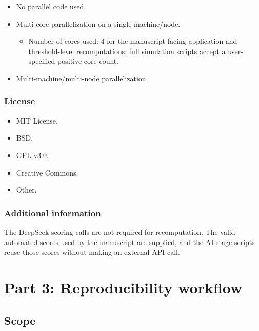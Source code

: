 \documentclass[
  10pt,
]{article}
\providecommand{\tightlist}{%
  \setlength{\itemsep}{0pt}\setlength{\parskip}{0pt}}
\begin{document}
\begin{itemize}
\tightlist
\item[$\square$]
  No parallel code used.
\item[$\boxtimes$]
  Multi-core parallelization on a single machine/node.

  \begin{itemize}
  \tightlist
  \item
    Number of cores used: 4 for the manuscript-facing application and
    threshold-level recomputations; full simulation scripts accept a
    user-specified positive core count.
  \end{itemize}
\item[$\square$]
  Multi-machine/multi-node parallelization.
\end{itemize}

\subsubsection{License}\label{license}

\begin{itemize}
\tightlist
\item[$\boxtimes$]
  MIT License.
\item[$\square$]
  BSD.
\item[$\square$]
  GPL v3.0.
\item[$\square$]
  Creative Commons.
\item[$\square$]
  Other.
\end{itemize}

\subsubsection{Additional information}\label{additional-information-1}

The DeepSeek scoring calls are not required for recomputation. The valid
automated scores used by the manuscript are supplied, and the AI-stage
scripts reuse those scores without making an external API call.

\section{Part 3: Reproducibility
workflow}\label{part-3-reproducibility-workflow}

\subsection{Scope}\label{scope}
\end{document}
